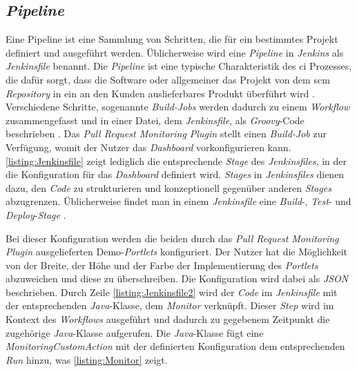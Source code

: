 \subsection{\textit{Pipeline}} 
Eine Pipeline ist eine Sammlung von Schritten, die für ein bestimmtes Projekt definiert und ausgeführt werden. Üblicherweise wird eine \textit{Pipeline} in \textit{Jenkins} als \textit{Jenkinsfile} benannt. Die \textit{Pipeline} ist eine typische Charakteristik des \ac{ci} Prozesses, die dafür sorgt, dass die Software oder allgemeiner das Projekt von dem \ac{scm} \textit{Repository} in ein an den Kunden auslieferbares Produkt überführt wird \citep{pipeline, dev-ops-handbuch}. Verschiedene Schritte, sogenannte \textit{Build-Jobs} werden dadurch zu einem \textit{Workflow} zusammengefasst und in einer Datei, dem \textit{Jenkinsfile}, als \textit{Groovy}-Code beschrieben \citep{apache-software-foundation}. Das \textit{Pull Request Monitoring Plugin} stellt einen \textit{Build-Job} zur Verfügung, womit der Nutzer das \textit{Dashboard} vorkonfigurieren kann. \autoref{listing:Jenkinsfile} zeigt lediglich die entsprechende \textit{Stage} des \textit{Jenkinsfiles}, in der die Konfiguration für das \textit{Dashboard} definiert wird. 
\textit{Stages} in \textit{Jenkinsfiles} dienen dazu, den \textit{Code} zu strukturieren und konzeptionell gegenüber anderen \textit{Stages} abzugrenzen. Üblicherweise findet man in einem \textit{Jenkinsfile} eine \textit{Build}-, \textit{Test}- und \textit{Deploy}-\textit{Stage} \citep{pipeline}. 



Bei dieser Konfiguration werden die beiden durch das \textit{Pull Request Monitoring Plugin} ausgelieferten Demo-\textit{Portlets} konfiguriert. Der Nutzer hat die Möglichkeit von der Breite, der Höhe und der Farbe der Implementierung des \textit{Portlets} abzuweichen und diese zu überschreiben. Die Konfiguration wird dabei als \textit{JSON} beschrieben. Durch Zeile \autoref{listing:Jenkinsfile2} wird der \textit{Code} im \textit{Jenkinsfile} mit der entsprechenden \textit{Java}-Klasse, dem \textit{Monitor} verknüpft. Dieser \textit{Step} wird im Kontext des \textit{Workflows} ausgeführt und dadurch zu gegebenem Zeitpunkt die zugehörige \textit{Java}-Klasse aufgerufen. Die \textit{Java}-Klasse fügt eine \textit{MonitoringCustomAction} mit der definierten Konfiguration dem entsprechenden \textit{Run} hinzu, was \autoref{listing:Monitor} zeigt.

